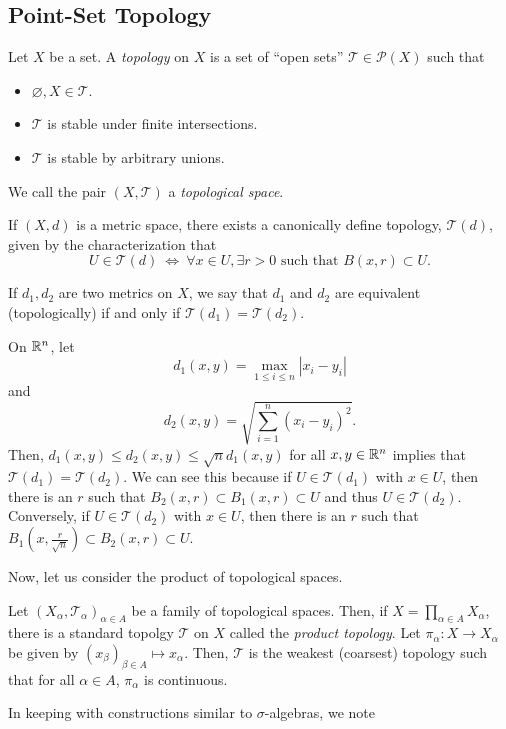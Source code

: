 \documentclass[11pt,leqno,oneside]{amsbook}
\numberwithin{thm}{section}
\renewcommand{\P}{\mathcal{P}}
\newcommand{\Top}{\mathcal{T}}
\begin{document}
\subsection{Point-Set Topology}
\begin{defn}
  Let $X$ be a set. A \emph{topology} on $X$ is a set of ``open sets''
  $\Top \in \P(X)$ such that
  \begin{itemize}
  \item $\varnothing, X \in \Top$.
  \item $\Top$ is stable under finite intersections.
  \item $\Top$ is stable by arbitrary unions.
  \end{itemize}
  We call the pair $(X,\Top)$ a \emph{topological space}.
\end{defn}
\begin{rmk}
  If $(X,d)$ is a metric space, there exists a canonically define
  topology, $\Top(d)$, given by the characterization that \[
    U \in \Top(d) \ \iff \ \forall x \in U, \exists r > 0 \text{ such
      that } B(x,r) \subset U.
  \]
\end{rmk}
If $d_1,d_2$ are two metrics on $X$, we say that $d_1$ and $d_2$ are
equivalent (topologically) if and only if $\Top(d_1) = \Top(d_2)$.
\begin{example}
  On ${\mathbb R}^n$, let \[
    d_1(x,y) = \max_{1 \leq i \leq n} \left| x_i - y_i \right|
  \]
  and \[
    d_2(x,y) = \sqrt{\sum_{i=1}^n (x_i-y_i)^2}.
  \]
  Then, $d_1(x,y) \leq d_2(x,y) \leq \sqrt{n} d_1(x,y)$ for all $x,y
  \in {\mathbb R}^n$ implies that $\Top(d_1) = \Top(d_2)$. We can see this
  because if $U \in \Top(d_1)$ with $x \in U$, then there is an $r$
  such that $B_2(x,r) \subset B_1(x,r) \subset U$ and thus $U \in
  \Top(d_2)$. Conversely, if $U \in \Top(d_2)$ with $x \in U$, then
  there is an $r$ such that $B_1(x,\frac{r}{\sqrt{n}}) \subset
  B_2(x,r) \subset U$. 
\end{example}
Now, let us consider the product of topological spaces.
\begin{defn}
  Let $(X_\alpha, \Top_\alpha)_{\alpha \in A}$ be a family of
  topological spaces. Then, if $X = \prod_{\alpha \in A} X_\alpha$,
  there is a standard topolgy $\Top$ on $X$ called the \emph{product
    topology}. Let $\pi_\alpha: X \to X_\alpha$ be given by
  $(x_\beta)_{\beta \in A} \mapsto x_\alpha$. Then, $\Top$ is the
  weakest (coarsest) topology such that for all $\alpha \in A$,
  $\pi_\alpha$ is continuous. 
\end{defn}
In keeping with constructions similar to $\sigma$-algebras, we note
\end{document}
